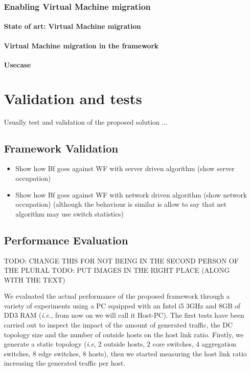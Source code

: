\documentclass[12pt,english,oneside]{book}
\begin{document}
\subsection{Enabling Virtual Machine migration}
\subsubsection{State of art: Virtual Machine migration}
\subsubsection{Virtual Machine migration in the framework}
\subsubsection{Usecase}

\chapter{Validation and tests \label{cha:valtes} }

Usually test and validation of the proposed solution ...

\section{Framework Validation}

\begin{itemize}
	\item Show how Bf goes against WF with server driven algorithm (show server occupation)
	\item Show how Bf goes against WF with network driven algorithm (show network occupation) (although the behaviour is similar is allow to say that net algorithm may use switch statistics)
\end{itemize}
\newpage


\section{Performance Evaluation}
\label{sec:perf}
\hspace{0.6cm}

TODO: CHANGE THIS FOR NOT BEING IN THE SECOND PERSON OF THE PLURAL
TODO: PUT IMAGES IN THE RIGHT PLACE (ALONG WITH THE TEXT)

We evaluated the actual performance of the proposed framework through a variety of experiments using a PC equipped with an Intel i5 3GHz and 8GB of DD3 RAM (\textit{i.e.}, from now on we will call it Host-PC).
The first tests have been carried out to inspect the impact of the amount of generated traffic, the DC topology size and the number of outside hosts on the host link ratio.
Firstly, we generate a static topology (\textit{i.e}, $2$ outside hosts, $2$ core switches, $4$ aggregation switches, $8$ edge switches, $8$ hosts), then we started measuring the host link ratio increasing the generated traffic per host.
\end{document}
